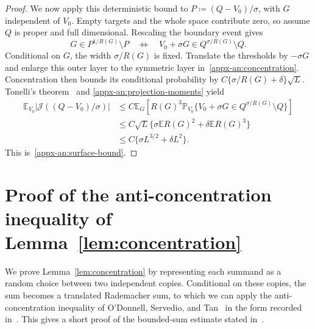 \documentclass[11pt,letterpaper]{article}
\theoremstyle{remark}
\newcommand{\E}{\mathbb E}
\newcommand{\Pp}{\mathbb P}
\newcommand{\surf}{\mathcal J}
\begin{document}
\begin{proof}
We now apply this deterministic bound to \(P\coloneqq (Q-V_0)/\sigma\),
with \(G\) independent of \(V_0\). Empty targets and the whole space
contribute zero, so assume \(Q\) is proper and full dimensional.
Rescaling the boundary event gives
\[
 G\in P^{1/R(G)}\setminus P
 \quad\Longleftrightarrow\quad
 V_0+\sigma G\in Q^{\sigma/R(G)}\setminus Q.
\]
Conditional on \(G\), the width \(\sigma/R(G)\) is fixed. Translate
the thresholds by \(-\sigma G\) and enlarge this outer layer to the
symmetric layer in~\eqref{appx-an:concentration}. Concentration then
bounds its conditional probability by
\(C\{\sigma/R(G)+\delta\}\sqrt L\). Tonelli's
theorem~\cite[Section~2.5]{Folland1999} and
\eqref{appx-an:projection-moments} yield
\begin{align*}
 \E_{V_0}|\surf((Q-V_0)/\sigma)|
 &\le C\E_G\left[R(G)^3
       \Pp_{V_0}\{V_0+\sigma G\in Q^{\sigma/R(G)}\setminus Q\}\right]\\
 &\le C\sqrt L\{\sigma\E R(G)^2+\delta\E R(G)^3\}\\
 &\le C\{\sigma L^{3/2}+\delta L^2\}.
\end{align*}
This is~\eqref{appx-an:surface-bound}.
\end{proof}

\section{\texorpdfstring{Proof of the anti-concentration inequality of Lemma~\ref{lem:concentration}}{Proof of the anti-concentration inequality of Lemma 1}}\label{appx-app:concentration}

\label{appx-conc:conditioning}

We prove Lemma~\ref{lem:concentration} by representing each summand
as a random choice between two independent copies. Conditional on these
copies, the sum becomes a translated Rademacher sum, to which we can
apply the anti-concentration inequality of O'Donnell, Servedio, and
Tan~\cite{OST} in the form recorded in~\cite[Lemma~J.4]{CCKK2022}.
This gives a short proof of the bounded-sum estimate stated
in~\cite[Lemma~2.1]{AL}.
\end{document}
